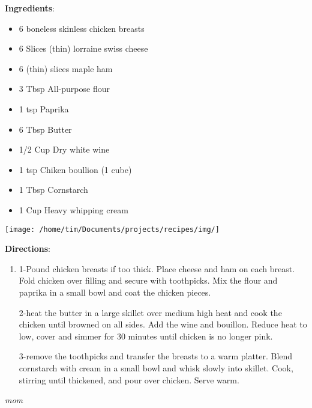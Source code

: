 \documentclass[11pt, twoside, openany]{book}
\begin{document}
\begin{minipage}[t]{0.8\linewidth}
\textbf{Ingredients}:\vspace{-3mm}
\begin{multicols}{2}
\begin{itemize}\setlength\itemsep{-1mm}
\item 6 boneless skinless chicken breasts
\item 6 Slices (thin) lorraine swiss cheese
\item 6 (thin) slices maple ham
\item 3 Tbsp All-purpose flour
\item 1 tsp Paprika
\item 6 Tbsp Butter
\item 1/2 Cup Dry white wine
\item 1 tsp Chiken boullion (1 cube)
\item 1 Tbsp Cornstarch
\item 1 Cup Heavy whipping cream
\end{itemize}
\end{multicols}
\end{minipage}
\begin{minipage}[t]{0.2\linewidth}
\centering \strut\vspace*{-\baselineskip}\newline
\texttt{[image: /home/tim/Documents/projects/recipes/img/]}\\
\end{minipage}\vspace{3mm}
\textbf{Directions}:
\vspace{-3mm}\begin{enumerate}\setlength\itemsep{-1mm}
\item 1-Pound chicken breasts if too thick. Place cheese and ham on each breast. Fold chicken over filling and secure with toothpicks. Mix the flour and paprika in a small bowl and coat the chicken pieces.

2-heat the butter in a large skillet over medium high heat and cook the chicken until browned on all sides. Add the wine and bouillon. Reduce heat to low, cover and simmer for 30 minutes until chicken is no longer pink.

3-remove the toothpicks and transfer the breasts to a warm platter. Blend cornstarch with cream in a small bowl and whisk slowly into skillet. Cook, stirring until thickened, and pour over chicken. Serve warm. 
\end{enumerate}
 \label{chocolate-brownies}\hfill\textit{mom}\\
\end{document}
